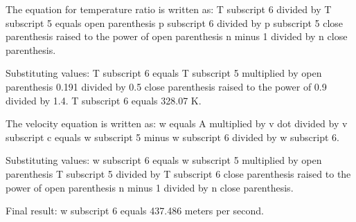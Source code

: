 The equation for temperature ratio is written as:  
T subscript 6 divided by T subscript 5 equals open parenthesis p subscript 6 divided by p subscript 5 close parenthesis raised to the power of open parenthesis n minus 1 divided by n close parenthesis.  

Substituting values:  
T subscript 6 equals T subscript 5 multiplied by open parenthesis 0.191 divided by 0.5 close parenthesis raised to the power of 0.9 divided by 1.4.  
T subscript 6 equals 328.07 K.  

The velocity equation is written as:  
w equals A multiplied by v dot divided by v subscript c equals w subscript 5 minus w subscript 6 divided by w subscript 6.  

Substituting values:  
w subscript 6 equals w subscript 5 multiplied by open parenthesis T subscript 5 divided by T subscript 6 close parenthesis raised to the power of open parenthesis n minus 1 divided by n close parenthesis.  

Final result:  
w subscript 6 equals 437.486 meters per second.